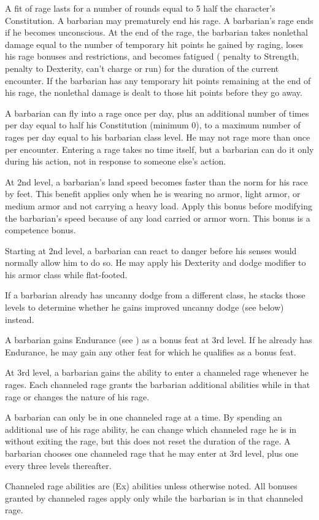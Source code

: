 \par A fit of rage lasts for a number of rounds equal to 5 \add half the character's Constitution.   A barbarian may prematurely end his
rage.  A barbarian's rage ends if he becomes unconscious. At the end of the rage, the barbarian takes nonlethal damage equal to the number of temporary hit points he gained by raging, loses his rage bonuses and restrictions, and becomes fatigued ( penalty to Strength,  penalty to Dexterity, can't charge or run) for the duration of the current encounter.  If the barbarian has any temporary hit points remaining at the end of his rage, the nonlethal damage is dealt to those hit points before they go away.

\par A barbarian can fly into a rage once per day, plus an additional number of times per day equal to half his Constitution (minimum 0), to a maximum number of rages per day equal to his barbarian class level. He may not rage more than once per encounter. Entering a rage takes no time itself, but a barbarian can do it only during his action, not in response to someone else's action.

 At 2nd level, a barbarian's land speed becomes faster than the norm for his race by  feet. This benefit applies only when he is wearing no armor, light armor, or medium  armor and not carrying a heavy load. Apply this bonus before modifying the barbarian's speed because of any load carried or armor worn. This bonus is a competence bonus.

 Starting at 2nd level, a barbarian can react to danger before his senses would normally allow him to do so. He may apply his Dexterity and dodge modifier to his armor class while flat-footed.

If a barbarian already has uncanny dodge from a different class, he stacks those levels to determine whether he gains improved uncanny dodge (see below) instead.

 A barbarian gains Endurance (see ) as a bonus feat at 3rd level. If he already has Endurance, he may gain any other feat for which he qualifies as a bonus feat.

 At 3rd level, a barbarian gains the ability to enter a channeled rage whenever he rages. Each channeled rage grants the barbarian additional abilities while in that rage or changes the nature of his rage.
\par A barbarian can only be in one channeled rage at a time. By spending an additional use of his rage ability, he can change which channeled rage he is in without exiting the rage, but this does not reset the duration of the rage. A barbarian chooses one channeled rage that he may enter at 3rd level, plus one every three levels thereafter.
\par Channeled rage abilities are (Ex) abilities unless otherwise noted. All bonuses granted by channeled rages apply only while the barbarian is in that channeled rage.

